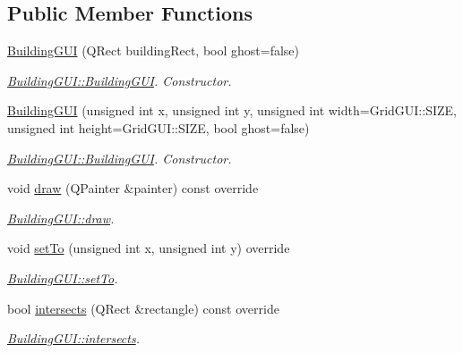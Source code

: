 \subsection*{Public Member Functions}
\begin{DoxyCompactItemize}
\item 
\hyperlink{classBuildingGUI_ad8569800006326c84850f3f34d20a4de}{Building\-G\-U\-I} (Q\-Rect building\-Rect, bool ghost=false)
\begin{DoxyCompactList}\small\item\em \hyperlink{classBuildingGUI_ad8569800006326c84850f3f34d20a4de}{Building\-G\-U\-I\-::\-Building\-G\-U\-I}. Constructor. \end{DoxyCompactList}\item 
\hyperlink{classBuildingGUI_ad98adac46b8a133ecfa03525aeab4475}{Building\-G\-U\-I} (unsigned int x, unsigned int y, unsigned int width=Grid\-G\-U\-I\-::\-S\-I\-Z\-E, unsigned int height=Grid\-G\-U\-I\-::\-S\-I\-Z\-E, bool ghost=false)
\begin{DoxyCompactList}\small\item\em \hyperlink{classBuildingGUI_ad8569800006326c84850f3f34d20a4de}{Building\-G\-U\-I\-::\-Building\-G\-U\-I}. Constructor. \end{DoxyCompactList}\item 
void \hyperlink{classBuildingGUI_ad56a1e74ed82e39bf51743f4d188a302}{draw} (Q\-Painter \&painter) const override
\begin{DoxyCompactList}\small\item\em \hyperlink{classBuildingGUI_ad56a1e74ed82e39bf51743f4d188a302}{Building\-G\-U\-I\-::draw}. \end{DoxyCompactList}\item 
void \hyperlink{classBuildingGUI_a5e193692876cb989f9d7ad83ab9c2450}{set\-To} (unsigned int x, unsigned int y) override
\begin{DoxyCompactList}\small\item\em \hyperlink{classBuildingGUI_a5e193692876cb989f9d7ad83ab9c2450}{Building\-G\-U\-I\-::set\-To}. \end{DoxyCompactList}\item 
bool \hyperlink{classBuildingGUI_a3e6895207c3ca7dc2a61446ddd246de1}{intersects} (Q\-Rect \&rectangle) const override
\begin{DoxyCompactList}\small\item\em \hyperlink{classBuildingGUI_a3e6895207c3ca7dc2a61446ddd246de1}{Building\-G\-U\-I\-::intersects}. \end{DoxyCompactList}\end{DoxyCompactItemize}

